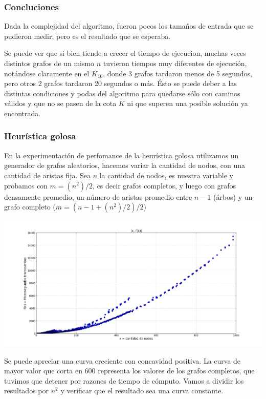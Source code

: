 \subsubsection{Concluciones}
Dada la complejidad del algoritmo, fueron pocos los tama\~nos de entrada que se pudieron medir, pero es el resultado que se esperaba.

Se puede ver que si bien tiende a crecer el tiempo de ejecucion, muchas veces distintos grafos de un mismo $n$ tuvieron tiempos muy diferentes de ejecuci\'on, not\'andose claramente en el $K_{16}$, donde 3 grafos tardaron menos de 5 segundos, pero otros 2 grafos tardaron 20 segundos o m\'as. \'Esto se puede deber a las distintas condiciones y podas del algoritmo para quedarse s\'olo con caminos v\'alidos y que no se pasen de la cota $K$ ni que superen una posible soluci\'on ya encontrada.

\subsubsection{Heur\'istica golosa}

En la experimentaci\'on de perfomance de la heur\'istica golosa utilizamos un generador de grafos aleatorios, hacemos variar la cantidad de nodos, con una cantidad de aristas fija. Sea $n$ la cantidad de nodos, es nuestra variable y probamos con $m = (n^2)/2$, es decir grafos completos, y luego con grafos densamente promedio, un n\'umero de aristas promedio entre $n-1$ (\'arbos) y un grafo completo ($ m = (n - 1 + (n^2)/2) /2 $)

\begin{center}
\includegraphics[scale=0.45]{img/golosa_fx.png}
\end{center}
\vspace{2mm}

Se puede apreciar una curva creciente con concavidad positiva. La curva de mayor valor que corta en 600 representa los valores de los grafos completos, que tuvimos que detener por razones de tiempo de c\'omputo. Vamos a dividir los resultados por $n^2$ y verificar que el resultado sea una curva constante.


